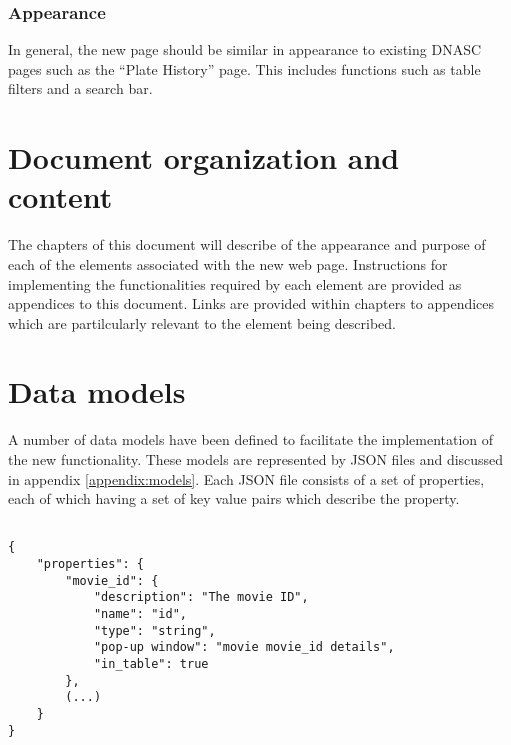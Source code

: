 \subsubsection{Appearance}
In general, the new page should be similar in appearance to existing DNASC pages such as 
the ``Plate History'' page. This includes functions such as table filters and a search bar. 

\section{Document organization and content}

The chapters of this document will describe of the appearance and purpose of each of the
elements associated with the new web page. Instructions for implementing the 
functionalities required by each element are provided as appendices to this document. Links
are provided within chapters to appendices which are partilcularly relevant to the element 
being described.

\section{Data models}

A number of data models have been defined to facilitate the implementation of the new
functionality. These models are represented by JSON files and discussed in appendix 
\ref{appendix:models}. Each JSON file consists of a set of properties, each of which 
having a set of key value pairs which describe the property.

\begin{verbatim}
    
{ 
    "properties": {
        "movie_id": { 
            "description": "The movie ID",
            "name": "id",
            "type": "string",
            "pop-up window": "movie movie_id details",
            "in_table": true
        },
        (...)
    }
}

\end{verbatim}
